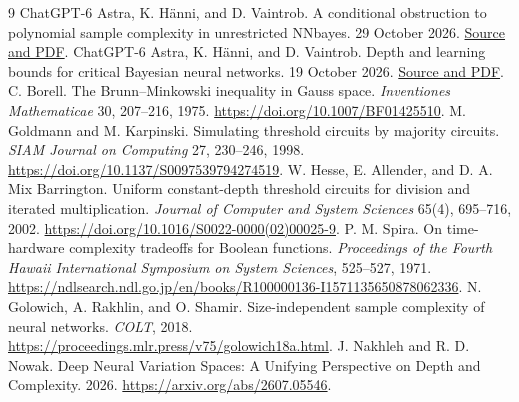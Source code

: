 \documentclass[11pt]{article}
\begin{document}
\begin{thebibliography}{9}
 ChatGPT-6 Astra, K. H\"anni, and D. Vaintrob.
A conditional obstruction to polynomial sample complexity in unrestricted NNbayes.
29 October 2026.
\href{https://github.com/kaarelh/AI-works/tree/main/neural-network-generalization/works-in-progress/conditional-nonpolynomial-learning}{Source and PDF}.
 ChatGPT-6 Astra, K. H\"anni, and D. Vaintrob.
Depth and learning bounds for critical Bayesian neural networks.
19 October 2026.
\href{https://github.com/kaarelh/AI-works/tree/main/neural-network-generalization/works-in-progress/critical-depth}{Source and PDF}.
 C. Borell.
The Brunn--Minkowski inequality in Gauss space.
\emph{Inventiones Mathematicae} 30, 207--216, 1975.
\url{https://doi.org/10.1007/BF01425510}.
 M. Goldmann and M. Karpinski.
Simulating threshold circuits by majority circuits.
\emph{SIAM Journal on Computing} 27, 230--246, 1998.
\url{https://doi.org/10.1137/S0097539794274519}.
 W. Hesse, E. Allender, and D. A. Mix Barrington.
Uniform constant-depth threshold circuits for division and iterated multiplication.
\emph{Journal of Computer and System Sciences} 65(4), 695--716, 2002.
\url{https://doi.org/10.1016/S0022-0000(02)00025-9}.
 P. M. Spira.
On time-hardware complexity tradeoffs for Boolean functions.
\emph{Proceedings of the Fourth Hawaii International Symposium on
System Sciences}, 525--527, 1971.
\url{https://ndlsearch.ndl.go.jp/en/books/R100000136-I1571135650878062336}.
 N. Golowich, A. Rakhlin, and O. Shamir.
Size-independent sample complexity of neural networks.
\emph{COLT}, 2018.
\url{https://proceedings.mlr.press/v75/golowich18a.html}.
 J. Nakhleh and R. D. Nowak.
Deep Neural Variation Spaces: A Unifying Perspective on Depth and Complexity.
2026. \url{https://arxiv.org/abs/2607.05546}.
\end{thebibliography}
\end{document}
